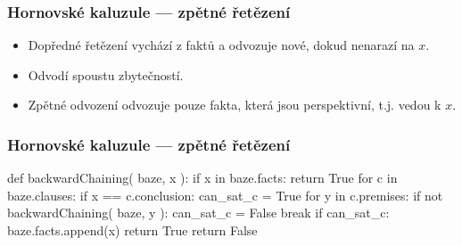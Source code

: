 \documentclass[red,professionalfont]{beamer}
\theoremstyle{definition}
\newcommand{\0}{\mbox{${\bf 0}$}}
\begin{document}
\begin{frame}[fragile]\frametitle{Hornovské kaluzule --- zpětné řetězení}
\begin{itemize}
 \item Dopředné řetězení vychází z faktů a odvozuje nové, dokud nenarazí na $x$.\pause
 \item Odvodí spoustu zbytečností.\pause
 \item Zpětné odvození odvozuje pouze fakta, která jsou perspektivní, t.j. vedou k $x$.
\end{itemize}
\end{frame}

\begin{frame}[fragile]\frametitle{Hornovské kaluzule --- zpětné řetězení}
\begin{python}
def backwardChaining( baze, x ):
  if x in baze.facts:
    return True
  for c in baze.clauses:
    if x == c.conclusion:
      can_sat_c = True
      for y in c.premises:
        if not backwardChaining( baze, y ):
          can_sat_c = False
          break
      if can_sat_c:
        baze.facts.append(x)
        return True
  return False
\end{python}
\end{frame}
\end{document}
